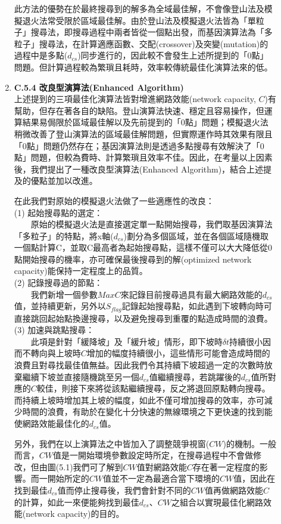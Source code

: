 \documentclass[12pt,a4paper]{article}
\begin{document}
\begin{description}
\begin{enumerate}
此方法的優勢在於最終搜尋到的解多為全域最佳解，不會像登山法及模擬退火法常受限於區域最佳解。由於登山法及模擬退火法皆為「單粒子」搜尋法，即搜尋過程中兩者皆從一個點出發，而基因演算法為「多粒子」搜尋法，在計算適應函數、交配(crossover)及突變(mutation)的過程中是多點($d_{cs}$)同步進行的，因此較不會發生上述所提到的「0點」問題。但計算過程較為繁瑣且耗時，效率較傳統最佳化演算法來的低。\\


\item [\bf ]{\textbf{\Kai C.5.4 改良型演算法(Enhanced Algorithm) }}\\

上述提到的三項最佳化演算法皆對增進網路效能(network capacity, $C$)有幫助，但存在著各自的缺陷。登山演算法快速、穩定且容易操作，但運算結果易侷限於區域最佳解以及先前提到的「0點」問題；模擬退火法稍微改善了登山演算法的區域最佳解問題，但實際運作時其效果有限且「0點」問題仍然存在；基因演算法則是透過多點搜尋有效解決了「0點」問題，但較為費時、計算繁瑣且效率不佳。因此，在考量以上因素後，我們提出了一種改良型演算法(Enhanced Algorithm)，結合上述提及的優點並加以改進。

在此我們對原始的模擬退火法做了一些適應性的改良：\\
(1) 起始搜尋點的選定：\\
　　原始的模擬退火法是直接選定單一點開始搜尋，我們取基因演算法「多粒子」的特點，將x軸($d_{cs}$)劃分為多個區域，並在各個區域隨機取一個點計算C，並取C最高者為起始搜尋點，這樣不僅可以大大降低從0點開始搜尋的機率，亦可確保最後搜尋到的解(optimized network capacity)能保持一定程度上的品質。\\
(2) 記錄搜尋過的節點：\\
　　我們新增一個參數$MaxC$來記錄目前搜尋過具有最大網路效能的$d_{cs}$值，並持續更新，另外以$S_{flag}$記錄起始搜尋點，如此遇到下坡轉向時可直接跳回起始點換邊搜尋，以及避免搜尋到重覆的點造成時間的浪費。\\
(3) 加速與跳點搜尋：\\
　　此項是針對「緩降坡」及「緩升坡」情形，即下坡時$\delta t$持續很小因而不轉向與上坡時$C$增加的幅度持續很小，這些情形可能會造成時間的浪費且對尋找最佳值無益。因此我們令其持續下坡超過一定的次數時放棄繼續下坡並直接隨機跳至另一個$d_{cs}$值繼續搜尋，若跳躍後的$d_{cs}$值所對應的$C$較佳，則接下來將從該點繼續搜尋，反之將退回原點轉向搜尋。而持續上坡時增加其上坡的幅度，如此不僅可增加搜尋的效率，亦可減少時間的浪費，有助於在變化十分快速的無線環境之下更快速的找到能使網路效能最佳化的$d_{cs}$值。

另外，我們在以上演算法之中皆加入了調整競爭視窗($CW$)的機制。一般而言，$CW$值是一開始環境參數設定時所定，在搜尋過程中不會做修改，但由圖(5.1)我們可了解到$CW$值對網路效能$C$存在著一定程度的影響。而一開始所定的$CW$值並不一定為最適合當下環境的$CW$值，因此在找到最佳$d_{cs}$值而停止搜尋後，我們會針對不同的$CW$值再做網路效能$C$的計算，如此一來便能夠找到最佳$d_{cs}$、$CW$之組合以實現最佳化網路效能(network capacity)的目的。\\



\end{enumerate}
\end{description}
\end{document}
